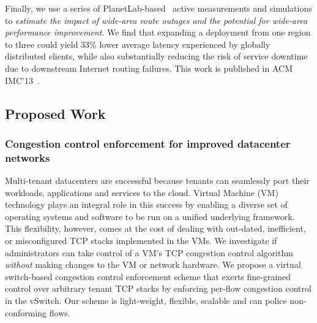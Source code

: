 Finally, we use a series of PlanetLab-based~\cite{planetlab} active measurements and
simulations to {\em estimate the impact of wide-area route outages and
  the potential for wide-area performance improvement}. We find that
expanding a deployment from one region to three could yield 33\% lower
average latency experienced by globally distributed clients, while
also substantially reducing the risk of service downtime due to
downstream Internet routing failures.
This work is published in ACM IMC'13~\cite{he2013next}.

\subsection{Proposed Work}
\subsubsection{Congestion control enforcement for improved datacenter networks}
\iffalse
DCTCP~\cite{alizadeh2011dctcp} is a drop-in congestion control replacement for TCP that aims to keep 
switch buffers low in the network. Companies such as Morgan Stanley have 
instituted DCTCP in their datacenter~\cite{judd2015dctcp}. 
DCTCP, however, requires changes to the TCP stack. 
In public datacenters, providers may not have control over the transport stack. 
In other words, cloud providers can not enforce the transport layer used by customers, 
for example tenants can use whatever version of TCP (either CUBIC, New Reno or DCTCP) in 
Amazon's dedicated instances or VMs, IBM's bare-metal machines etc. 

So is there any way we can achieve DCTCP-like properties in the network 
(either in the core or on the soft edge, like Open vSwitch) even for the stacks we can not control? 
If the overlying TCP stack can be inferred, perhaps we can play some games in the network to 
bias its congestion window. For example, we could rate-limit packets at the edge according to 
a more conservative congestion window, or we could modify the receiver's 
advertised window size on incoming TCP packets to enforce the sender to slow its rate. 
\fi
Multi-tenant datacenters are successful because tenants
can seamlessly port their workloads, applications and services
to the cloud. Virtual Machine (VM) technology plays an integral role in this success
by enabling a diverse set of operating systems and
software to be run on a unified underlying framework. This
flexibility, however, comes at the cost of dealing with out-dated, inefficient, or
misconfigured TCP stacks implemented in the VMs. We investigate if
administrators can take control of a VM's TCP congestion control
algorithm {\em without} making changes to the VM or network hardware.
We propose a virtual switch-based congestion control enforcement scheme that exerts fine-grained
control over arbitrary tenant TCP stacks by enforcing per-flow congestion
control in the vSwitch. Our scheme is light-weight, flexible, scalable and
can police non-conforming flows.

